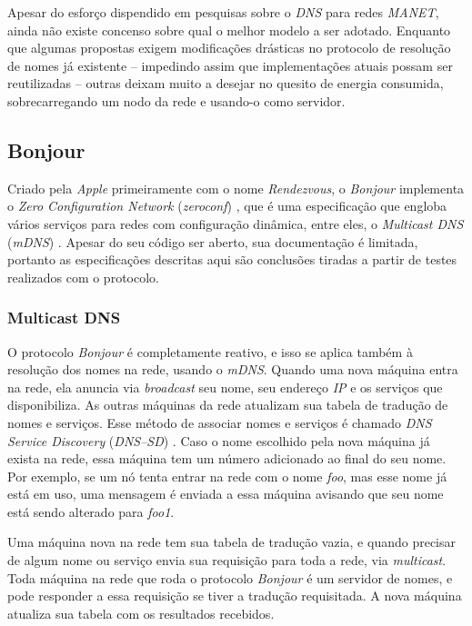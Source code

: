 
Apesar do esforço dispendido em pesquisas sobre o \textit{DNS} para redes \textit{MANET}, ainda não existe concenso sobre qual o melhor modelo a ser adotado. Enquanto que algumas propostas exigem modificações drásticas no protocolo de resolução de nomes já existente -- impedindo assim que implementações atuais possam ser reutilizadas -- outras deixam muito a desejar no quesito de energia consumida, sobrecarregando um nodo da rede e usando-o como servidor.

\subsection{Bonjour}

  Criado pela \textit{Apple} primeiramente com o nome \textit{Rendezvous}, o \textit{Bonjour} implementa o \textit{Zero Configuration Network} (\textit{zeroconf}) \cite{zeroconf}, que é uma especificação que engloba vários serviços para redes com configuração dinâmica, entre eles, o \textit{Multicast DNS} (\textit{mDNS}) \cite{mdns}. Apesar do seu código ser aberto, sua documentação é limitada, portanto as especificações descritas aqui são conclusões tiradas a partir de testes realizados com o protocolo.
  
  \subsubsection{Multicast DNS}
  
    O protocolo \textit{Bonjour} é completamente reativo, e isso se aplica também à resolução dos nomes na rede, usando o \textit{mDNS}. Quando uma nova máquina entra na rede, ela anuncia via \textit{broadcast} seu nome, seu endereço \emph{IP} e os serviços que disponibiliza. As outras máquinas da rede atualizam sua tabela de tradução de nomes e serviços. Esse método de associar nomes e serviços é chamado \textit{DNS Service Discovery} (\textit{DNS--SD}) \cite{dnssd}. Caso o nome escolhido pela nova máquina já exista na rede, essa máquina tem um número adicionado ao final do seu nome. Por exemplo, se um nó tenta entrar na rede com o nome \emph{foo}, mas esse nome já está em uso, uma mensagem é enviada a essa máquina avisando que seu nome está sendo alterado para \emph{foo1}.
    
    Uma máquina nova na rede tem sua tabela de tradução vazia, e quando precisar de algum nome ou serviço envia sua requisição para toda a rede, via \textit{multicast}. Toda máquina na rede que roda o protocolo \textit{Bonjour} é um servidor de nomes, e pode responder a essa requisição se tiver a tradução requisitada. A nova máquina atualiza sua tabela com os resultados recebidos.
    
